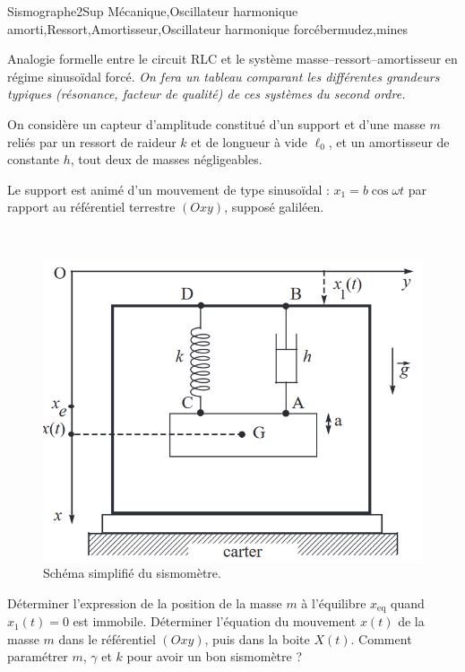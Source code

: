 \begin{exercise}{Sismographe}{2}{Sup}
{Mécanique,Oscillateur harmonique amorti,Ressort,Amortisseur,Oscillateur harmonique forcé}{bermudez,mines}

\begin{questions}
    \questioncours Analogie formelle entre le circuit RLC et le système masse--ressort--amortisseur en régime sinusoïdal forcé. \textsl{On fera un tableau comparant les différentes grandeurs typiques (résonance, facteur de qualité) de ces systèmes du second ordre.}
\end{questions}

\begin{multicols}{2}
    On considère un capteur d'amplitude constitué d'un support et d'une masse $m$ reliés par un ressort de raideur $k$ et de longueur à vide $\ell_0$, et un amortisseur de constante $h$, tout deux de masses négligeables.

    Le support est animé d'un mouvement de type sinusoïdal : $x_1 = b \cos\omega t$ par rapport au référentiel terrestre $(Oxy)$, supposé galiléen.

    \vspace{1cm}

    ~

\begin{figure}[H]
    \centering
    \includegraphics[width=\linewidth]{meca/oscharm/sismo.png}
    \caption{Schéma simplifié du sismomètre.}
\end{figure}
\end{multicols}

\begin{questions}    
    \question Déterminer l'expression de la position de la masse $m$ à l'équilibre $x_\text{eq}$ quand $x_1(t) = 0$ est immobile.
    \question Déterminer l'équation du mouvement $x(t)$ de la masse $m$ dans le référentiel $(Oxy)$, puis dans la boite $X(t)$.
    \question Comment paramétrer $m$, $\gamma$ et $k$ pour avoir un bon sismomètre ?
\end{questions}
\end{exercise}

